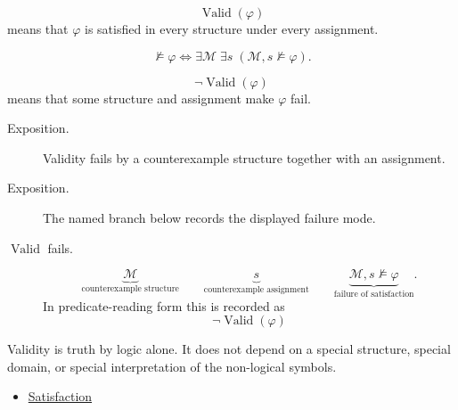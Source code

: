 \begin{remark*}
\[
  \operatorname{Valid}(\varphi)
\] means that \(\varphi\) is satisfied in
every structure under every assignment.
\end{remark*}

\begin{remark*}
\[
\not\models\varphi
\Longleftrightarrow
\exists \mathcal M\;\exists s\;(\mathcal M,s\not\models\varphi).
\]
\end{remark*}

\begin{remark*}
\[
  \neg\operatorname{Valid}(\varphi)
\] means that some structure and
assignment make \(\varphi\) fail.
\end{remark*}

\begin{remark*}
\begin{description}
  \item[Exposition.] Validity fails by a counterexample structure together with an assignment.
\end{description}
\end{remark*}

\begin{remark*}
\begin{description}
  \item[Exposition.] The named branch below records the displayed failure mode.
\item[\(\operatorname{Valid}\) fails.] \[
\underbrace{\mathcal M}_{\text{counterexample structure}}
\qquad
\underbrace{s}_{\text{counterexample assignment}}
\qquad
\underbrace{\mathcal M,s\not\models\varphi}_{\text{failure of satisfaction}}.
\]
  In predicate-reading form this is recorded as
  \[
    \neg\operatorname{Valid}(\varphi)
  \]
\end{description}
\end{remark*}

\begin{remark*}[Interpretation]
Validity is truth by logic alone. It does not depend on a special structure,
special domain, or special interpretation of the non-logical symbols.
\end{remark*}

\begin{dependencies}
\begin{itemize}
  \item \hyperref[def:fol-satisfaction]{Satisfaction}
\end{itemize}
\end{dependencies}


